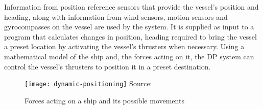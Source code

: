 

Information from position reference sensors that provide the vessel’s position and heading, along with information from wind sensors, motion sensors and gyrocompasses on the vessel are used by the system. It is supplied as input to a program that calculates changes in position, heading required to bring the vessel a preset location by activating the vessel’s thrusters when necessary. Using a mathematical model of the ship and, the forces acting on it, the DP system can control the vessel's thrusters to position it in a preset destination.

%
%

\begin{figure}
	\centering
	\caption{Forces acting on a ship and its possible movements}
	\texttt{[image: dynamic-positioning]}
	\hbox{\small Source: }
	\label{fig:shipforces}
\end{figure}

